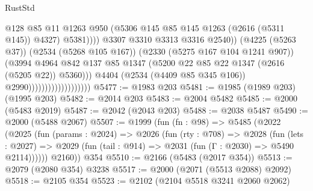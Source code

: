 \begin{lexlean}{RustStd}
\begin{coremodule}
                                                        @128
                                                        @85
                                                        @11
                                                        @1263
                                                        @950
                                                        (@5306
                                                          @145
                                                          @85
                                                          @145
                                                          @1263
                                                          (@2616 (@5311 @145))
                                                          @4327)
                                                        @5381))))
                                                @3307
                                                @3310
                                                @3313
                                                @3316
                                                @2540))
                                            (@4225 (@5263 @37))
                                            (@2534 (@5268 @105 @167))
                                            (@2330 (@5275 @167 @104 @1241 @907))
                                            (@3994
                                              @4964
                                              @842
                                              @137
                                              @85
                                              @1347
                                              (@5200 @22 @85 @22 @1347 (@2616 (@5205 @22)) @5360)))
                                          @4404
                                          (@2534 (@4409 @85 @345 @106))
                                          @2990)))))))))))))))))))
@5477 := @1983 @203
@5481 := @1985 (@1989 @203) (@1995 @203)
@5482 := @2014 @203
@5483 := @2004 @5482
@5485 := @2000 (@5483 @2019)
@5487 := @2042 (@2043 @203)
@5488 := @2038 @5487
@5490 := @2000 (@5488 @2067)
@5507 := @1999
    (fun (fn : @98) =>
    @5485
      (@2022
        (@2025
          (fun (params : @2024) =>
          @2026
            (fun (rty : @708) =>
            @2028
              (fun (lets : @2027) =>
              @2029 (fun (tail : @914) => @2031 (fun (Γ : @2030) => @5490 @2114))))))
        @2160))
    @354
@5510 := @2166 (@5483 (@2017 @354))
@5513 := @2079 (@2080 @354) @3238
@5517 := @2000 (@2071 (@5513 @2088) @2092)
@5518 := @2105 @354
@5523 := @2102 (@2104 @5518 @3241 @2060 @2062)

\end{coremodule}
\end{lexlean}
